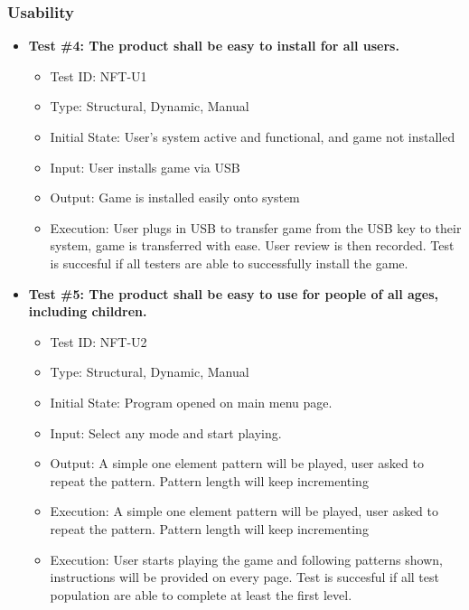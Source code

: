 \documentclass[12pt, titlepage]{article}
\begin{document}
\subsubsection{Usability}
\begin{itemize}
\item \textbf{Test \#4: The product shall be easy to install for all users.}
\begin{itemize}
\item Test ID: NFT-U1
\item Type: Structural, Dynamic, Manual			
\item Initial State: User's system active and functional, and game not installed 		
\item Input: User installs game via USB			
\item Output: Game is installed easily onto system				
\item Execution: User plugs in USB to transfer game from the USB key to their system, game is transferred with ease. User review is then recorded. Test is succesful if all testers are able to successfully install the game.
\end{itemize}

\item \textbf{Test \#5: The product shall be easy to use for people of all ages, including children.}
\begin{itemize}
\item Test ID: NFT-U2
\item Type: Structural, Dynamic, Manual				
\item Initial State: Program opened on main menu page.		
\item Input: Select any mode and start playing.
\item Output: A simple one element pattern will be played, user asked to repeat the pattern. Pattern length will keep incrementing
\item Execution: A simple one element pattern will be played, user asked to repeat the pattern. Pattern length will keep incrementing
\item Execution: User starts playing the game and following patterns shown, instructions will be provided on every page. Test is succesful if all test population are able to complete at least the first level.
\end{itemize}


\end{itemize}
\end{document}
